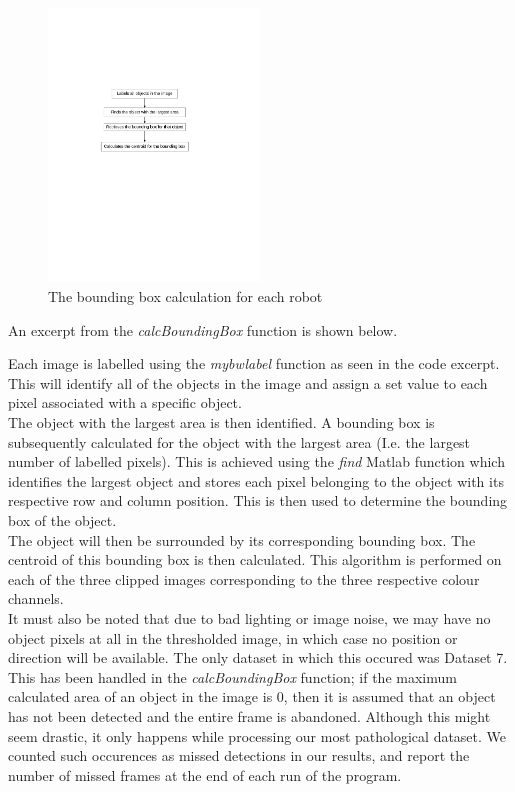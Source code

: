 \documentclass{article}
\begin{document}
\begin{figure}[h!] 
  \centering
    \includegraphics[width=0.5\textwidth]{../Drawings/boundingbox.pdf}
    \caption{The bounding box calculation for each robot }
    \label{fig:bounding}
\end{figure}

An excerpt from the \textit{calcBoundingBox} function is shown below.



Each image is labelled using the \textit{mybwlabel} function as seen in the code excerpt. This will identify all of the objects in the image and assign a set value to each pixel associated with a specific object.  \\

The object with the largest area is then identified. A bounding box is subsequently calculated for the object with the largest area (I.e. the largest number of labelled pixels). This is achieved using the \textit{find} Matlab function which identifies the largest object and stores each pixel belonging to the object with its respective row and column position. This is then used to determine the bounding box of the object.\\

The object will then be surrounded by its corresponding bounding box. The centroid of this bounding box is then calculated. This algorithm is performed on each of the three clipped images corresponding to the three respective colour channels.\\

It must also be noted that due to bad lighting or image noise, we may have no object pixels at all in the thresholded image, in which case no position or direction will be available. The only dataset in which this occured was Dataset 7. This has been handled in the \textit{calcBoundingBox} function; if the maximum calculated area of an object in the image is $0$, then it is assumed that an object has not been detected and the entire frame is abandoned. Although this might seem drastic, it only happens while processing our most pathological dataset. We counted such occurences as missed detections in our results, and report the number of missed frames at the end of each run of the program.
\end{document}

